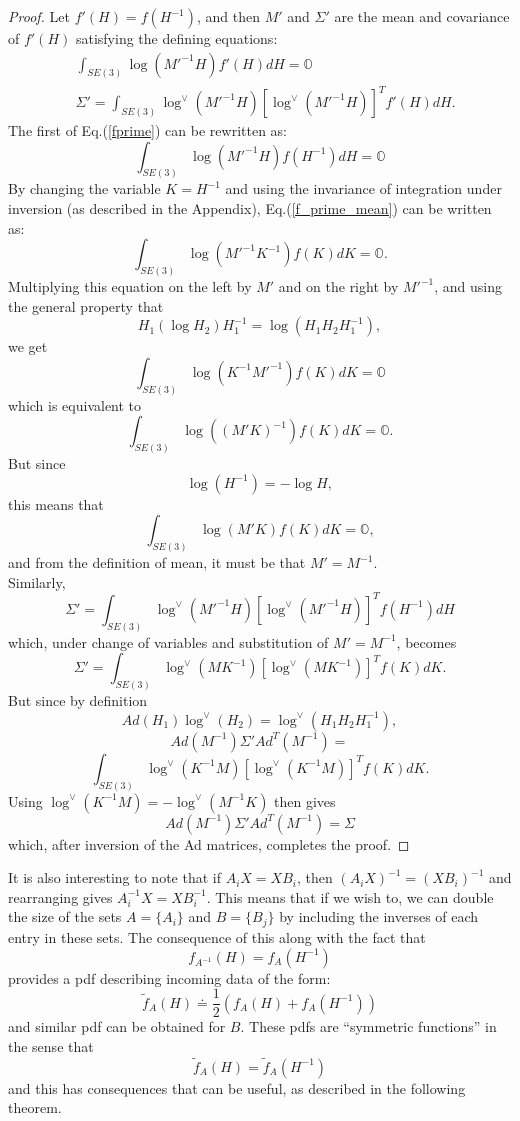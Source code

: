 \documentclass[twocolumn,10pt]{asme2ej}
\newcommand{\half}{\frac{1}{2}}
\begin{document}
\begin{proof}
Let $f'(H) = f(H^{-1})$, and then $M'$ and $\Sigma'$ are the mean and covariance of $f'(H)$ satisfying the defining equations:
\begin{equation}
\begin{split}
&\int_{SE(3)} \log({M'}^{-1} H) f'(H) dH = \mathbb{O} \\
&\Sigma' = \int_{SE(3)} \log^{\vee}({M'}^{-1} H) [\log^{\vee}({M'}^{-1} H)]^{T}  f'(H) dH. 
\end{split}
\label{fprime}
\end{equation}
The first of Eq.(\ref{fprime})  can be rewritten as:
\begin{equation}
\int_{SE(3)} \log({M'}^{-1} H) f(H^{-1}) dH = \mathbb{O}
\label{f_prime_mean}
\end{equation}
By changing the variable $K = H^{-1}$ and using the invariance of integration under inversion (as described in the Appendix), Eq.(\ref{f_prime_mean}) can be written as:
$$ \int_{SE(3)} \log({M'}^{-1} K^{-1}) f(K) dK = \mathbb{O}. $$
Multiplying this equation on the left by $M'$ and on the right by ${M'}^{-1}$, and using the general property that
$$ H_1 (\log H_2) H_1^{-1} = \log (H_1 H_2 H_1^{-1}), $$
we get 
$$ \int_{SE(3)} \log(K^{-1} {M'}^{-1}) f(K) dK = \mathbb{O} $$
which is equivalent to 
$$ \int_{SE(3)} \log(({M'} K)^{-1} ) f(K) dK = \mathbb{O}. $$
But since
$$ \log (H^{-1}) = -\log H, $$
this means that
$$ \int_{SE(3)} \log( {M'} K) f(K) dK = \mathbb{O}, $$
and from the definition of mean, it must be that $M' = M^{-1}$.\\
Similarly, 
$$ \Sigma' = \int_{SE(3)} \log^{\vee}({M'}^{-1} H) [\log^{\vee}({M'}^{-1} H)]^{T}  f(H^{-1}) dH $$
which, under change of variables and substitution of $M' = M^{-1}$, becomes
$$ \Sigma' = \int_{SE(3)} \log^{\vee}(M K^{-1}) [\log^{\vee}(M K^{-1})]^{T}  f(K) dK. $$
But since by definition 
$$ Ad(H_1) \log^{\vee}(H_2) = \log^{\vee} (H_1 H_2 H_1^{-1}), $$
$$ Ad(M^{-1}) \Sigma' Ad^T(M^{-1}) = $$
$$ \int_{SE(3)} \log^{\vee}(K^{-1} M) [\log^{\vee}(K^{-1} M)]^{T}  f(K) dK .$$
Using $\log^{\vee}(K^{-1} M) = - \log^{\vee}(M^{-1} K)$ then gives
$$ Ad(M^{-1}) \Sigma' Ad^T(M^{-1}) = \Sigma $$
which, after inversion of the Ad matrices, completes the proof.
\end{proof}

It is also interesting to note that if $A_i X = X B_i$, then $(A_i X)^{-1} = (X B_i)^{-1}$ and rearranging gives 
$A_{i}^{-1} X = X B_{i}^{-1}$. This means that if we wish to, we can double the size of
the sets $A = \{A_i\}$ and $B=\{B_j\}$ by including the inverses of each entry in these sets. The consequence of this along with the fact that 
$$ f_{A^{-1}}(H) = f_A(H^{-1}) $$ 
provides a pdf describing incoming data of the form:
$$ \tilde{f}_A(H) \doteq \half (f_A(H) + f_A(H^{-1})) $$
and similar pdf can be obtained for $B$. These pdfs are ``symmetric functions'' in the sense that
$$ \tilde{f}_A(H) = \tilde{f}_A(H^{-1}) $$
and this has consequences that can be useful, as described in the following theorem.
\end{document}
